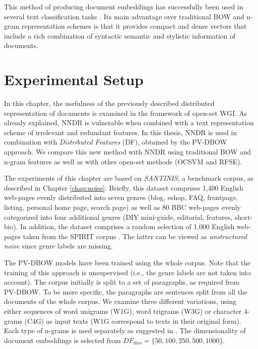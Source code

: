 This method of producing document embeddings has successfully been used in several text classification tasks \parencite{le2014distributed}. Its main advantage over traditional BOW and n-gram representation schemes is that it provides compact and dense vectors that include a rich combination of syntactic semantic and stylistic information of documents.

\section{Experimental Setup}\label{chap:word_embeddings:sec:experiments_setup}

In this chapter, the usefulness of the previously described distributed representation of documents is examined in the framework of open-set WGI. As already explained, NNDR is vulnerable when combined with a text representation scheme of irrelevant and redundant features. In this thesis, NNDR is used in combination with \textit{Distributed Features} (DF), obtained by the PV-DBOW approach. We compare this new method with NNDR using traditional BOW and n-gram features as well as with other open-set methods (OCSVM and RFSE).


The experiments of this chapter are based on \textit{SANTINIS}, a benchmark corpus, as described in Chapter \ref{chap:noise}. Briefly, this dataset comprises 1,400 English web-pages evenly distributed into seven genres (blog, eshop, FAQ, frontpage, listing, personal home page, search page) as well as 80 BBC web-pages evenly categorized into four additional genres (DIY mini-guide, editorial, features, short-bio). In addition, the dataset comprises a random selection of 1,000 English web-pages taken from the SPIRIT corpus \parencite{joho2004spirit}. The latter can be viewed as \textit{unstructured noise} since genre labels are missing.

The PV-DBOW models have been trained using the whole corpus. Note that the training of this approach is unsupervised (i.e., the genre labels are not taken into account). The corpus initially is split to a set of paragraphs, as required from PV-DBOW. To be more specific, the paragraphs are sentences split from all the documents of the whole corpus. We examine three different variations, using either sequences of word unigrams (W1G), word trigrams (W3G) or character 4-grams (C4G) as input texts (W1G correspond to texts in their original form). Each type of n-grams is used separately as suggested in \parencite{posadas2017application}. The dimensionality of document embeddings is selected from $DF_{dim}=\{50,100,250,500,1000\}$. 

